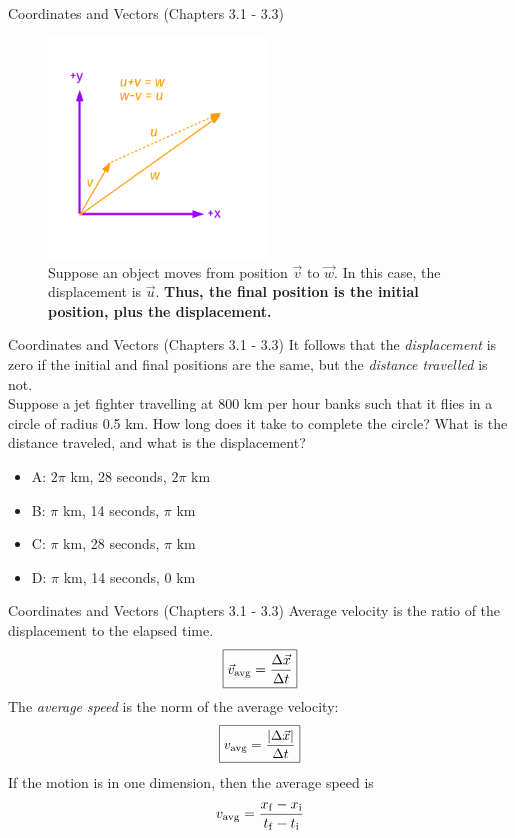 \documentclass{beamer}
\begin{document}
\begin{frame}{Coordinates and Vectors (Chapters 3.1 - 3.3)}
\begin{figure}
\centering
\includegraphics[width=0.52\textwidth]{figures/Vectors4.pdf}
\caption{\label{fig:displacement} Suppose an object moves from position $\vec{v}$ to $\vec{w}$.  In this case, the \alert{displacement} is $\vec{u}$. \textbf{Thus, the final position is the initial position, plus the displacement.}}
\end{figure}
\end{frame}

\begin{frame}{Coordinates and Vectors (Chapters 3.1 - 3.3)}
It follows that the \textit{displacement} is zero if the initial and final positions are the same, but the \textit{distance travelled} is not.\\
\vspace{0.2cm}
\small
Suppose a jet fighter travelling at 800 km per hour banks such that it flies in a circle of radius 0.5 km.  How long does it take to complete the circle?  What is the distance traveled, and what is the displacement?
\begin{itemize}
\item A: $2\pi$ km, 28 seconds, $2\pi$ km
\item B: $\pi$ km, 14 seconds, $\pi$ km
\item C: $\pi$ km, 28 seconds, $\pi$ km
\item D: $\pi$ km, 14 seconds, $0$ km
\end{itemize}
\end{frame}

\begin{frame}{Coordinates and Vectors (Chapters 3.1 - 3.3)}
\alert{Average velocity} is the ratio of the \alert{displacement} to the elapsed time.\\
\begin{equation}
\boxed{\vec{v}_{\rm avg} = \frac{\Delta \vec{x}}{\Delta t}}
\end{equation}
The \textit{average speed} is the norm of the average velocity:
\begin{equation}
\boxed{v_{\rm avg} = \frac{|\Delta \vec{x}|}{\Delta t}}
\end{equation}
If the motion is in one dimension, then the average speed is
\begin{equation}
v_{\rm avg} = \frac{x_{\rm f} - x_{\rm i}}{t_{\rm f} - t_{\rm i}}
\end{equation}
\end{frame}
\end{document}
